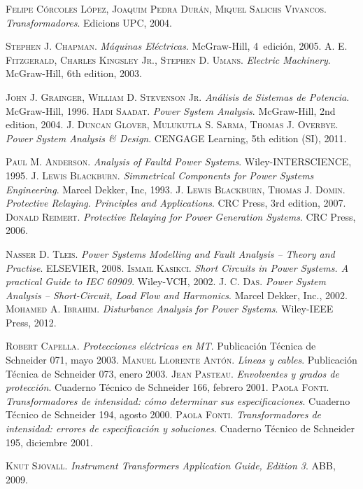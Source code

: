 \begin{thebibliography}{99}
     \textsc{Felipe C\'{o}rcoles L\'{o}pez, Joaquim Pedra Dur\'{a}n, Miquel Salichs Vivancos}. \textsl{Transformadores}.  Edicions UPC, 2004.


     \textsc{Stephen J. Chapman}. \textsl{M\'{a}quinas El\'{e}ctricas}.  McGraw-Hill, 4\textordfeminine\ edici\'{o}n, 2005.
     \textsc{A. E. Fitzgerald, Charles Kingsley Jr., Stephen D. Umans}. \textsl{Electric Machinery}.  McGraw-Hill, 6th edition, 2003.


     \textsc{John J. Grainger, William D. Stevenson Jr}. \textsl{An\'{a}lisis de Sistemas de Potencia}.  McGraw-Hill, 1996.
     \textsc{Hadi Saadat}. \textsl{Power System Analysis}.  McGraw-Hill, 2nd edition, 2004.
     \textsc{J. Duncan Glover, Mulukutla S. Sarma, Thomas J. Overbye}. \textsl{Power System Analysis \& Design}.  CENGAGE Learning, 5th edition (SI), 2011.

     \textsc{Paul M. Anderson}. \textsl{Analysis of Faultd Power Systems}.  Wiley-INTERSCIENCE, 1995.
     \textsc{J. Lewis Blackburn}. \textsl{Simmetrical Components for Power Systems Engineering}.  Marcel Dekker, Inc, 1993.
     \textsc{J. Lewis Blackburn, Thomas J. Domin}. \textsl{Protective Relaying. Principles and Applications}.  CRC Press, 3rd edition, 2007.
     \textsc{Donald Reimert}. \textsl{Protective Relaying for Power Generation Systems}.  CRC Press, 2006.


     \textsc{Nasser D. Tleis}. \textsl{Power Systems Modelling and Fault Analysis -- Theory and Practise}.  ELSEVIER, 2008.
     \textsc{Ismail Kasikci}. \textsl{Short Circuits in Power Systems. A practical Guide to IEC 60909}.  Wiley-VCH, 2002.
     \textsc{J. C. Das}. \textsl{Power System Analysis -- Short-Circuit, Load Flow and Harmonics}. Marcel Dekker, Inc., 2002.
     \textsc{Mohamed A. Ibrahim}. \textsl{Disturbance Analysis for Power Systems}. Wiley-IEEE Press, 2012.

     \textsc{Robert Capella}. \textsl{Protecciones el\'{e}ctricas en MT}.  Publicaci\'{o}n T\'{e}cnica de Schneider 071, mayo 2003.
     \textsc{Manuel Llorente Ant\'{o}n}. \textsl{L\'{\i}neas y cables}.  Publicaci\'{o}n T\'{e}cnica de Schneider 073, enero 2003.
     \textsc{Jean Pasteau}. \textsl{Envolventes y grados de protecci\'{o}n}.  Cuaderno T\'{e}cnico de Schneider 166, febrero 2001.
     \textsc{Paola Fonti}. \textsl{Transformadores de intensidad: c\'{o}mo determinar sus especificaciones}.  Cuaderno T\'{e}cnico de Schneider 194, agosto 2000.
     \textsc{Paola Fonti}. \textsl{Transformadores de intensidad: errores de especificaci\'{o}n y soluciones}.  Cuaderno T\'{e}cnico de Schneider 195, diciembre 2001.

     \textsc{Knut Sj\"{o}vall}. \textsl{Instrument Transformers Application Guide, Edition 3}.  ABB, 2009.

\end{thebibliography}
